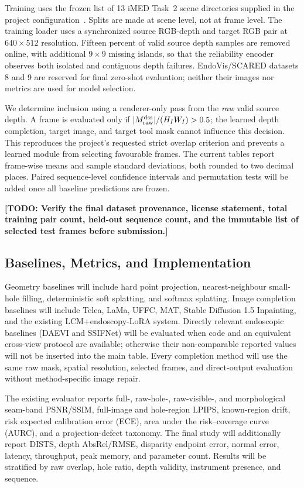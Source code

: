 \documentclass[letterpaper,10pt,conference]{ieeeconf}
\newcommand{\todo}[1]{\textcolor{todoRed}{\textbf{[TODO: #1]}}}
\begin{document}
Training uses the frozen list of 13 iMED Task~2 scene directories supplied in
the project configuration~\cite{imed2026}. Splits are made at scene level, not
at frame level. The training loader uses a synchronized source RGB-depth and
target RGB pair at $640\times512$ resolution. Fifteen percent of valid source
depth samples are removed online, with additional $9\times9$ missing islands,
so that the reliability encoder observes both isolated and contiguous depth
failures. EndoVis/SCARED datasets 8 and 9 are reserved for final zero-shot
evaluation; neither their images nor metrics are used for model selection.

We determine inclusion using a renderer-only pass from the \emph{raw} valid
source depth. A frame is evaluated only if
$|M_{\rm raw}^{\rm dss}|/(H_IW_I)>0.5$; the learned depth completion, target image,
and target tool mask cannot influence this decision. This reproduces the
project's requested strict overlap criterion and prevents a learned module from
selecting favourable frames. The current tables report frame-wise means and
sample standard deviations, both rounded to two decimal places. Paired
sequence-level confidence intervals and permutation tests will be added once
all baseline predictions are frozen.

\todo{Verify the final dataset provenance, license statement, total training
pair count, held-out sequence count, and the immutable list of selected test
frames before submission.}

\subsection{Baselines, Metrics, and Implementation}
\label{sec:implementation}

Geometry baselines will include hard point projection, nearest-neighbour
small-hole filling, deterministic soft splatting, and softmax splatting. Image
completion baselines will include Telea, LaMa, UFFC, MAT, Stable Diffusion 1.5
Inpainting, and the existing LCM+endoscopy-LoRA system. Directly relevant
endoscopic baselines (DAEVI and SSIFNet) will be evaluated when code and an
equivalent cross-view protocol are available; otherwise their non-comparable
reported values will not be inserted into the main table. Every completion
method will use the same raw mask, spatial resolution, selected frames, and
direct-output evaluation without method-specific image repair.

The existing evaluator reports full-, raw-hole-, raw-visible-, and morphological
seam-band PSNR/SSIM, full-image and hole-region LPIPS, known-region drift, risk
expected calibration error (ECE), area under the risk--coverage curve (AURC),
and a projection-defect taxonomy. The final study will additionally report DISTS, depth AbsRel/RMSE,
disparity endpoint error, normal error, latency, throughput, peak memory, and
parameter count. Results will be stratified by raw overlap, hole ratio, depth
validity, instrument presence, and sequence.
\end{document}

